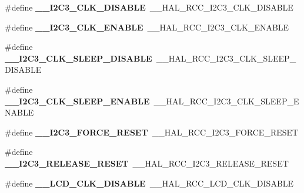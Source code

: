 \begin{DoxyCompactItemize}
\item 
\#define {\bfseries \+\_\+\+\_\+\+I2\+C3\+\_\+\+C\+L\+K\+\_\+\+D\+I\+S\+A\+B\+LE}~\+\_\+\+\_\+\+H\+A\+L\+\_\+\+R\+C\+C\+\_\+\+I2\+C3\+\_\+\+C\+L\+K\+\_\+\+D\+I\+S\+A\+B\+LE\hypertarget{group___h_a_l___r_c_c___aliased_ga7da00da30c1b02d1c1299dd878214db2}{}\label{group___h_a_l___r_c_c___aliased_ga7da00da30c1b02d1c1299dd878214db2}

\item 
\#define {\bfseries \+\_\+\+\_\+\+I2\+C3\+\_\+\+C\+L\+K\+\_\+\+E\+N\+A\+B\+LE}~\+\_\+\+\_\+\+H\+A\+L\+\_\+\+R\+C\+C\+\_\+\+I2\+C3\+\_\+\+C\+L\+K\+\_\+\+E\+N\+A\+B\+LE\hypertarget{group___h_a_l___r_c_c___aliased_gaf7f71023839a5cad83bada95ff73741f}{}\label{group___h_a_l___r_c_c___aliased_gaf7f71023839a5cad83bada95ff73741f}

\item 
\#define {\bfseries \+\_\+\+\_\+\+I2\+C3\+\_\+\+C\+L\+K\+\_\+\+S\+L\+E\+E\+P\+\_\+\+D\+I\+S\+A\+B\+LE}~\+\_\+\+\_\+\+H\+A\+L\+\_\+\+R\+C\+C\+\_\+\+I2\+C3\+\_\+\+C\+L\+K\+\_\+\+S\+L\+E\+E\+P\+\_\+\+D\+I\+S\+A\+B\+LE\hypertarget{group___h_a_l___r_c_c___aliased_ga35accdf6700c08b879d2540130cf19aa}{}\label{group___h_a_l___r_c_c___aliased_ga35accdf6700c08b879d2540130cf19aa}

\item 
\#define {\bfseries \+\_\+\+\_\+\+I2\+C3\+\_\+\+C\+L\+K\+\_\+\+S\+L\+E\+E\+P\+\_\+\+E\+N\+A\+B\+LE}~\+\_\+\+\_\+\+H\+A\+L\+\_\+\+R\+C\+C\+\_\+\+I2\+C3\+\_\+\+C\+L\+K\+\_\+\+S\+L\+E\+E\+P\+\_\+\+E\+N\+A\+B\+LE\hypertarget{group___h_a_l___r_c_c___aliased_gabd22a89f4561c5988d6553525c4f2ace}{}\label{group___h_a_l___r_c_c___aliased_gabd22a89f4561c5988d6553525c4f2ace}

\item 
\#define {\bfseries \+\_\+\+\_\+\+I2\+C3\+\_\+\+F\+O\+R\+C\+E\+\_\+\+R\+E\+S\+ET}~\+\_\+\+\_\+\+H\+A\+L\+\_\+\+R\+C\+C\+\_\+\+I2\+C3\+\_\+\+F\+O\+R\+C\+E\+\_\+\+R\+E\+S\+ET\hypertarget{group___h_a_l___r_c_c___aliased_ga82bddd15cceee64406a35ffc4f31591f}{}\label{group___h_a_l___r_c_c___aliased_ga82bddd15cceee64406a35ffc4f31591f}

\item 
\#define {\bfseries \+\_\+\+\_\+\+I2\+C3\+\_\+\+R\+E\+L\+E\+A\+S\+E\+\_\+\+R\+E\+S\+ET}~\+\_\+\+\_\+\+H\+A\+L\+\_\+\+R\+C\+C\+\_\+\+I2\+C3\+\_\+\+R\+E\+L\+E\+A\+S\+E\+\_\+\+R\+E\+S\+ET\hypertarget{group___h_a_l___r_c_c___aliased_gad171d101f4540442a523779af94780a7}{}\label{group___h_a_l___r_c_c___aliased_gad171d101f4540442a523779af94780a7}

\item 
\#define {\bfseries \+\_\+\+\_\+\+L\+C\+D\+\_\+\+C\+L\+K\+\_\+\+D\+I\+S\+A\+B\+LE}~\+\_\+\+\_\+\+H\+A\+L\+\_\+\+R\+C\+C\+\_\+\+L\+C\+D\+\_\+\+C\+L\+K\+\_\+\+D\+I\+S\+A\+B\+LE\hypertarget{group___h_a_l___r_c_c___aliased_ga00955b2f1f6c5709acc566689563e727}{}\label{group___h_a_l___r_c_c___aliased_ga00955b2f1f6c5709acc566689563e727}


\end{DoxyCompactItemize}
